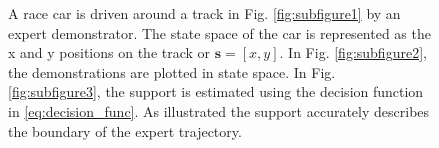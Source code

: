 \documentclass[10pt, conference]{ieeeconf}      %
\begin{document}
\begin{figure}[ht]
\centering
{}
\quad
{}

\caption{ A race car is driven around a track in Fig. \ref{fig:subfigure1} by an expert demonstrator. The state space of the car is represented as the x and y positions on the track or $\mathbf{s} = [x,y]$. In Fig. \ref{fig:subfigure2}, the demonstrations are plotted in state space. In Fig. \ref{fig:subfigure3}, the support is estimated using the decision function in \ref{eq:decision_func}. As illustrated the support accurately describes the boundary of the expert trajectory. }
\label{fig:support_example}
\end{figure}
\end{document}
